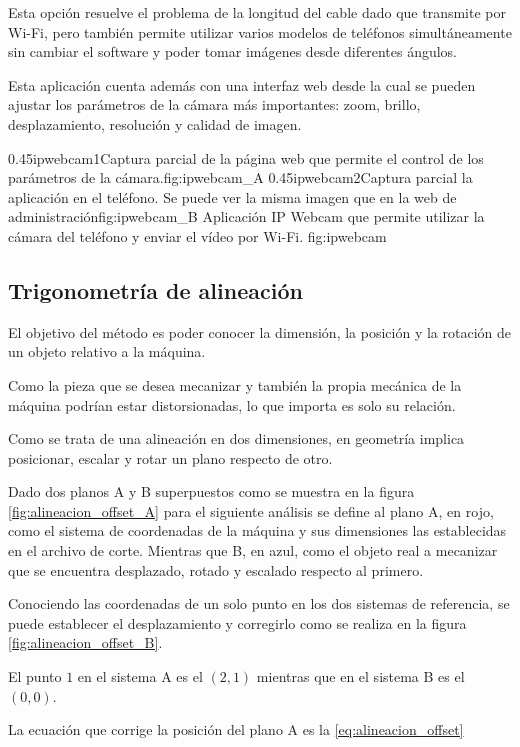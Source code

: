    Esta opción resuelve el problema de la longitud del cable dado que transmite por Wi-Fi, pero también permite utilizar varios modelos de teléfonos simultáneamente sin cambiar el software y poder tomar imágenes desde diferentes ángulos. \par

  Esta aplicación cuenta además con una interfaz web desde la cual se pueden ajustar los parámetros de la cámara más importantes: zoom, brillo, desplazamiento, resolución y calidad de imagen.


\subfigab
         {0.45}{ipwebcam1}{Captura parcial de la página web que permite el control de los parámetros de la cámara.}{fig:ipwebcam_A}
         {0.45}{ipwebcam2}{Captura parcial la aplicación en el teléfono. Se puede ver la misma imagen que en la web de administración}{fig:ipwebcam_B}
         {Aplicación IP Webcam que permite utilizar la cámara del teléfono y enviar el vídeo por Wi-Fi.}
         {fig:ipwebcam}


\subsection{Trigonometría de alineación}

   El objetivo del método es poder conocer la dimensión, la posición y la rotación de un objeto relativo a la máquina. \par

Como la pieza que se desea mecanizar y también la propia mecánica de la máquina podrían estar distorsionadas, lo que importa es solo su relación. \par

   Como se trata de una alineación en dos dimensiones, en geometría implica posicionar, escalar y rotar un plano respecto de otro.\par

   Dado dos planos A y B superpuestos como se muestra en la figura \ref{fig:alineacion_offset_A} para el siguiente análisis se define al plano A, en rojo, como el sistema de coordenadas de la máquina y sus dimensiones las establecidas en el archivo de corte.
   Mientras que B, en azul, como el objeto real a mecanizar que se encuentra desplazado, rotado y escalado respecto al primero.\par
   Conociendo las coordenadas de un solo punto en los dos sistemas de referencia, se puede establecer el desplazamiento y corregirlo como se realiza en la figura \ref{fig:alineacion_offset_B}.\par
   El punto $1$ en el sistema A es el $(2,1)$ mientras que en el sistema B es el $(0,0)$.\par
   La ecuación que corrige la posición del plano A es la \ref{eq:alineacion_offset}

